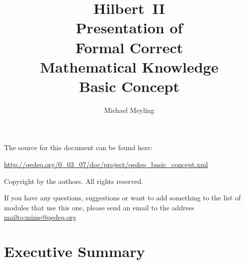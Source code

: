 \documentclass[a4paper,german,10pt,twoside]{book}
\title{\textbf{Hilbert~II} \\
\vspace*{1cm} 
Presentation of \\ 
Formal Correct \\
Mathematical Knowledge \\
\vspace*{1cm} Basic Concept}
\author{
Michael Meyling
}
\theoremstyle{definition}
\theoremstyle{remark}
\begin{document}
\maketitle

\setlength{\parskip}{5pt plus 2pt minus 1pt}
\mbox{}
\vfill

\par
The source for this document can be found here:
\par
\url{http://qedeq.org/0_03_07/doc/project/qedeq_basic_concept.xml}

\par
Copyright by the authors. All rights reserved.
\par
If you have any questions, suggestions or want to add something to the list of modules that use this one, please send an email to the address \url{mailto:mime@qedeq.org}

\setlength{\parskip}{0pt}
\tableofcontents

\setlength{\parskip}{5pt plus 2pt minus 1pt}

\chapter*{Executive Summary} \label{chapter0} \hypertarget{chapter0}{}
\end{document}
